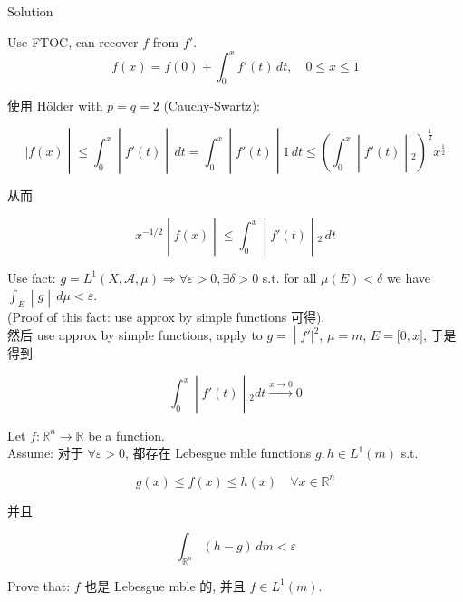 \begin{qlsolution}{Solution}

Use FTOC, can recover \(f\) from \(f'\).\\

\[f(x) = f(0) + \int_{0}^{x}f'(t)\, dt,\quad 0 \leq x \leq 1\]

使用 Hölder with \(p = q = 2\) (Cauchy-Swartz):

\[\left. |f(x) \middle| \leq \int_{0}^{x} \middle| f'(t) \middle| \, dt = \int_{0}^{x} \middle| f'(t) \middle| 1\, dt \leq (\int_{0}^{x} \middle| f'(t) \middle| {}_{2})^{\frac{1}{2}}x^{\frac{1}{2}} \right.\]

从而

\[\left. x^{- 1/2} \middle| f(x) \middle| \leq \int_{0}^{x} \middle| f'(t) \middle| {}_{2}\, dt \right.\]

Use fact: \(g = L^{1}(X,\mathcal{A},\mu)\Longrightarrow\forall\varepsilon > 0,\exists\delta > 0\) s.t. for all \(\mu(E) < \delta\) we have \(\left. \int_{E} \middle| g \middle| \, d\mu < \varepsilon \right.\).\\
(Proof of this fact: use approx by simple functions 可得).\\
然后 use approx by simple functions, apply to \(\left. g = \middle| f'|^{2} \right.\), \(\mu = m\), \(E = \lbrack 0,x\rbrack\), 于是得到

\[\left. \int_{0}^{x} \middle| f'(t) \middle| {}_{2}dt\overset{x\rightarrow 0}{\rightarrow}0 \right.\]

\end{qlsolution}

\begin{example}

Let \(f:\mathbb{R}^{n}\rightarrow\mathbb{R}\) be a function.\\
Assume: 对于 \(\forall\varepsilon > 0\), 都存在 Lebesgue mble functions \(g,h \in L^{1}(m)\) s.t.

\[g(x) \leq f(x) \leq h(x)\quad\forall x \in \mathbb{R}^{n}\]

并且

\[\int_{\mathbb{R}^{n}}(h - g)\, dm < \varepsilon\]

Prove that: \(f\) 也是 Lebesgue mble 的, 并且 \(f \in L^{1}(m)\).\\

\end{example}

